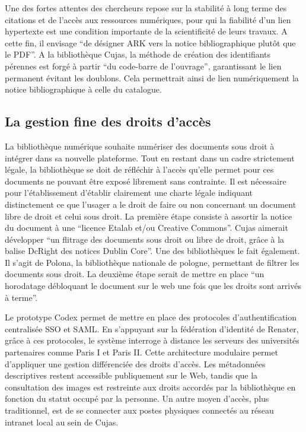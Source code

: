 Une des fortes attentes des chercheurs repose sur la stabilité à long terme des citations et de l'accès aux ressources numériques, pour qui la fiabilité d'un lien hypertexte est une condition importante de la scientificité de leurs travaux. A cette fin, il envisage \enquote{de désigner ARK vers la notice bibliographique plutôt que le PDF}. A la bibliothèque Cujas, la méthode de création des identifiants pérennes est forgé à partir \enquote{du code-barre de l'ouvrage}, garantissant le lien permanent évitant les doublons. Cela permettrait ainsi de lien numériquement la notice bibliographique à celle du catalogue.

\subsection{La gestion fine des droits d'accès}
La bibliothèque numérique souhaite numériser des documents sous droit à intégrer dans sa nouvelle plateforme. Tout en restant dans un cadre strictement légale, la bibliothèque se doit de réfléchir à l'accès qu'elle permet pour ces documents ne pouvant être exposé librement sans contrainte. Il est nécessaire pour l'établissement d'établir clairement une charte légale indiquant distinctement ce que l'usager a le droit de faire ou non concernant un document libre de droit et celui sous droit. La première étape consiste à assortir la notice du document à une \enquote{licence Etalab et/ou Creative Commons}. Cujas aimerait développer \enquote{un flitrage des documents sous droit ou libre de droit, grâce à la balise DcRight des notices Dublin Core}. Une des bibliothèques le fait également. Il s'agit de Polona, la bibliothèque nationale de pologne, permettant de filtrer les documents sous droit. La deuxième étape serait de mettre en place \enquote{un horodatage débloquant le document sur le web une fois que les droits sont arrivés à terme}.

Le prototype Codex permet de mettre en place des protocoles d'authentification centralisée SSO et SAML. En s'appuyant sur la fédération d'identité de Renater, grâce à ces protocoles, le système interroge à distance les serveurs des universités partenaires comme Paris I et Paris II. Cette architecture modulaire permet d'appliquer une gestion différenciée des droits d'accès. Les métadonnées descriptives restent accessible publiquement sur le Web, tandis que la consultation des images est restreinte aux droits accordés par la bibliothèque en fonction du statut occupé par la personne. Un autre moyen d'accès, plus traditionnel, est de se connecter aux postes physiques connectés au réseau intranet local au sein de Cujas.

